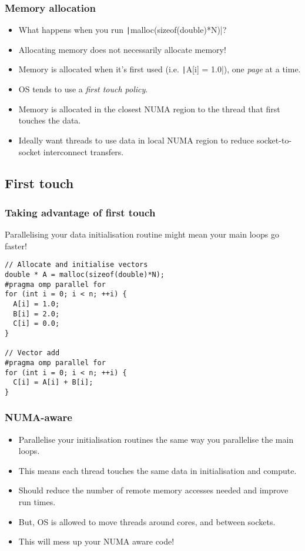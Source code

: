 \documentclass{beamer}
\begin{document}
\begin{frame}
\frametitle{Memory allocation}
\begin{itemize}
  \item What happens when you run \texttt|malloc(sizeof(double)*N)|?
  \pause
  \item Allocating memory does not necessarily allocate memory!
  \item Memory is allocated when it's first used (i.e. \texttt|A[i] = 1.0|), one \emph{page} at a time.
  \item OS tends to use a \emph{first touch policy}.
  \item Memory is allocated in the closest NUMA region to the thread that first touches the data.
  \item Ideally want threads to use data in local NUMA region to reduce socket-to-socket interconnect transfers.
\end{itemize}
\end{frame}

\subsection{First touch}
\begin{frame}[fragile]
\frametitle{Taking advantage of first touch}
Parallelising your data initialisation routine might mean your main loops go faster!


\begin{verbatim}
// Allocate and initialise vectors
double * A = malloc(sizeof(double)*N);
#pragma omp parallel for
for (int i = 0; i < n; ++i) {
  A[i] = 1.0;
  B[i] = 2.0;
  C[i] = 0.0;
}

// Vector add
#pragma omp parallel for
for (int i = 0; i < n; ++i) {
  C[i] = A[i] + B[i];
}
\end{verbatim}

\end{frame}

\begin{frame}
\frametitle{NUMA-aware}
\begin{itemize}
  \item Parallelise your initialisation routines the same way you parallelise the main loops.
  \item This means each thread touches the same data in initialisation and compute.
  \item Should reduce the number of remote memory accesses needed and improve run times.
  \item But, OS is allowed to move threads around cores, and between sockets.
  \item This will mess up your NUMA aware code!
\end{itemize}
\end{frame}
\end{document}

